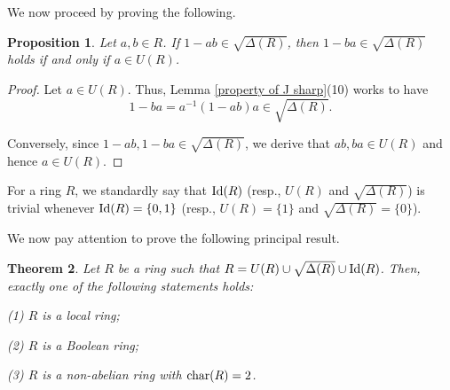 \documentclass[11pt]{amsart}
\newtheorem{theorem}{Theorem}[section]
\newtheorem{proposition}[theorem]{Proposition}
\theoremstyle{definition}
\begin{document}
We now proceed by proving the following.

\begin{proposition}
Let \( a, b \in R \). If \( 1 - ab \in \sqrt{\Delta(R)} \), then \( 1 - ba \in \sqrt{\Delta(R)} \) holds if and only if \( a \in U(R) \).	
\end{proposition}

\begin{proof}
Let $a\in U(R)$. Thus, Lemma \ref{property of J sharp}(10) works to have $$1-ba=a^{-1}(1-ab)a \in \sqrt{\Delta(R)}.$$

Conversely, since $1 - ab, 1-ba \in \sqrt{\Delta(R)}$, we derive that $ab, ba\in U(R)$ and hence $a\in U(R)$.
\end{proof}

For a ring \( R \), we standardly say that \( {\rm Id}(R) \) (resp., \( U(R) \) and \( \sqrt{\Delta(R)} \)) is trivial whenever \( {\rm Id}(R) = \{0,1\} \) (resp., \( U(R) = \{1\} \) and \( \sqrt{\Delta(R)} = \{0\} \)).

\medskip

We now pay attention to prove the following principal result.

\begin{theorem}
Let \( R \) be a ring such that \( R = U(R) \cup \sqrt{\Delta(R)} \cup {\rm Id}(R) \). Then, exactly one of the following statements holds:
	
(1) \( R \) is a local ring;
	
(2) \( R \) is a Boolean ring;
	
(3) \( R \) is a non-abelian ring with \( {\rm char}(R) = 2 \).
\end{theorem}
\end{document}
